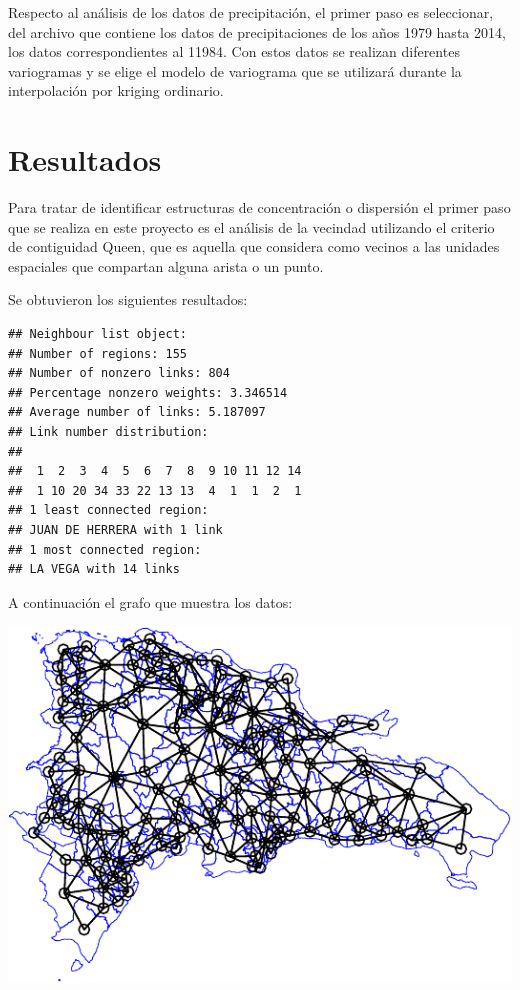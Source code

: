 \documentclass[11pt,]{article}
\begin{document}
Respecto al análisis de los datos de precipitación, el primer paso es
seleccionar, del archivo que contiene los datos de precipitaciones de
los años 1979 hasta 2014, los datos correspondientes al 11984. Con estos
datos se realizan diferentes variogramas y se elige el modelo de
variograma que se utilizará durante la interpolación por kriging
ordinario.

\section{Resultados}\label{resultados}

Para tratar de identificar estructuras de concentración o dispersión el
primer paso que se realiza en este proyecto es el análisis de la
vecindad utilizando el criterio de contiguidad Queen, que es aquella que
considera como vecinos a las unidades espaciales que compartan alguna
arista o un punto.

Se obtuvieron los siguientes resultados:

\begin{verbatim}
## Neighbour list object:
## Number of regions: 155 
## Number of nonzero links: 804 
## Percentage nonzero weights: 3.346514 
## Average number of links: 5.187097 
## Link number distribution:
## 
##  1  2  3  4  5  6  7  8  9 10 11 12 14 
##  1 10 20 34 33 22 13 13  4  1  1  2  1 
## 1 least connected region:
## JUAN DE HERRERA with 1 link
## 1 most connected region:
## LA VEGA with 14 links
\end{verbatim}

A continuación el grafo que muestra los datos:

\includegraphics{proyecto_files/figure-latex/unnamed-chunk-3-1.pdf}
\end{document}
